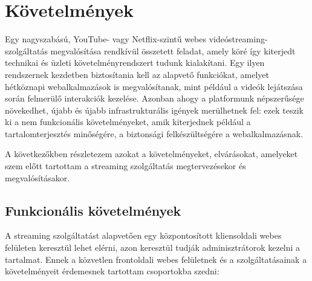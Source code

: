 \chapter{Követelmények}

Egy nagyszabású, YouTube- vagy Netflix-szintű webes videóstreaming-szolgáltatás megvalósítása rendkívül összetett feladat, amely köré így kiterjedt technikai és üzleti követelményrendszert tudunk kialakítani. Egy ilyen rendszernek kezdetben biztosítania kell az alapvető funkciókat, amelyet hétköznapi webalkalmazások is megvalósítanak, mint például a videók lejátszása során felmerülő interakciók kezelése. Azonban ahogy a platformunk népszerűsége növekedhet, újabb és újabb infrastrukturális igények merülhetnek fel: ezek teszik ki a nem funkcionális követelményeket, amik kiterjednek például a tartalomterjesztés minőségére, a biztonsági felkészültségére a webalkalmazásnak.

A következőkben részletezem azokat a követelményeket, elvárásokat, amelyeket szem előtt tartottam a streaming szolgáltatás megtervezésekor és megvalósításakor.

\section{Funkcionális követelmények}

A streaming szolgáltatást alapvetően egy központosított kliensoldali webes felületen keresztül lehet elérni, azon keresztül tudják adminisztrátorok kezelni a tartalmat. Ennek a közvetlen frontoldali webes felületnek és a szolgáltatásainak a követelményeit érdemesnek tartottam csoportokba szedni:


